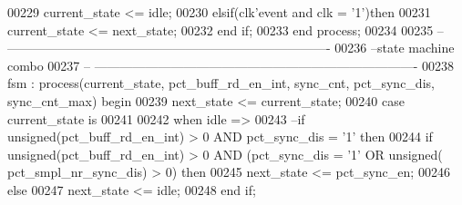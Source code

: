 \begin{DoxyCode}
00229         \textcolor{vhdlchar}{current_state} \textcolor{vhdlchar}{<=} \textcolor{vhdlchar}{idle};
00230     \textcolor{keywordflow}{elsif}\textcolor{vhdlchar}{(}\textcolor{vhdlchar}{clk}\textcolor{vhdlchar}{'}\textcolor{vhdlkeyword}{event} \textcolor{keywordflow}{and} \textcolor{vhdlchar}{clk} \textcolor{vhdlchar}{=} \textcolor{vhdlchar}{'}\textcolor{vhdllogic}{}\textcolor{vhdllogic}{1}\textcolor{vhdlchar}{'}\textcolor{vhdlchar}{)}\textcolor{keywordflow}{then}
00231          \textcolor{vhdlchar}{current_state} \textcolor{vhdlchar}{<=} \textcolor{vhdlchar}{next_state};
00232     \textcolor{keywordflow}{end} \textcolor{keywordflow}{if}; 
00233 \textcolor{keywordflow}{end} \textcolor{keywordflow}{process};
00234 
00235 \textcolor{keyword}{-- ----------------------------------------------------------------------------}
00236 \textcolor{keyword}{--state machine combo}
00237 \textcolor{keyword}{-- ----------------------------------------------------------------------------}
00238 fsm : \textcolor{keywordflow}{process}(current_state, pct_buff_rd_en_int, sync_cnt, pct_sync_dis, 
      sync_cnt_max) \textcolor{keywordflow}{begin}
00239     \textcolor{vhdlchar}{next_state} \textcolor{vhdlchar}{<=} \textcolor{vhdlchar}{current_state};
00240     \textcolor{keywordflow}{case} \textcolor{vhdlchar}{current_state} \textcolor{keywordflow}{is}
00241       
00242         \textcolor{keywordflow}{when} \textcolor{vhdlchar}{idle} \textcolor{vhdlchar}{=}\textcolor{vhdlchar}{>}
00243 \textcolor{keyword}{         --if unsigned(pct\_buff\_rd\_en\_int) > 0 AND pct\_sync\_dis = '1' then}
00244          \textcolor{keywordflow}{if} \textcolor{comment}{unsigned}\textcolor{vhdlchar}{(}\textcolor{vhdlchar}{pct_buff_rd_en_int}\textcolor{vhdlchar}{)} \textcolor{vhdlchar}{>} \textcolor{vhdllogic}{}\textcolor{vhdllogic}{0} \textcolor{keywordflow}{AND} \textcolor{vhdlchar}{(}\textcolor{vhdlchar}{pct_sync_dis} \textcolor{vhdlchar}{=} \textcolor{vhdlchar}{'}\textcolor{vhdllogic}{}\textcolor{vhdllogic}{1}\textcolor{vhdlchar}{'} \textcolor{keywordflow}{OR} \textcolor{comment}{unsigned}\textcolor{vhdlchar}{(}\textcolor{vhdlchar}{
      pct_smpl_nr_sync_dis}\textcolor{vhdlchar}{)} \textcolor{vhdlchar}{>} \textcolor{vhdllogic}{}\textcolor{vhdllogic}{0}\textcolor{vhdlchar}{)} \textcolor{keywordflow}{then}
00245             \textcolor{vhdlchar}{next_state} \textcolor{vhdlchar}{<=} \textcolor{vhdlchar}{pct\_sync\_en};
00246          \textcolor{keywordflow}{else} 
00247             \textcolor{vhdlchar}{next_state} \textcolor{vhdlchar}{<=} \textcolor{vhdlchar}{idle};
00248          \textcolor{keywordflow}{end} \textcolor{keywordflow}{if};

\end{DoxyCode}
